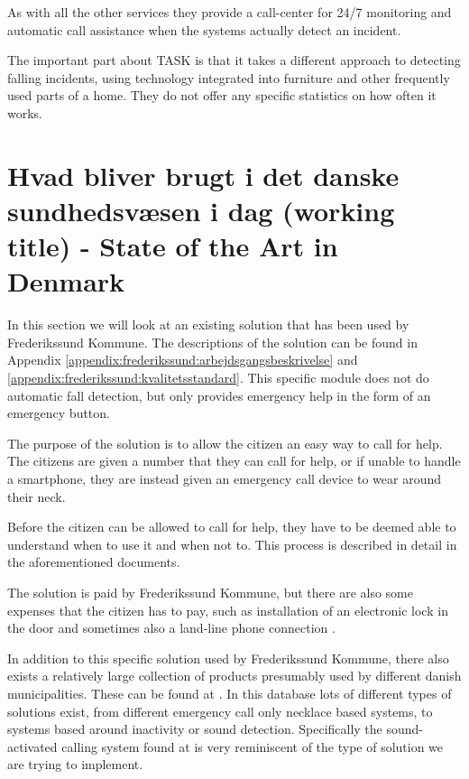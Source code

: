 As with all the other services they provide a call-center for 24/7 monitoring and automatic call assistance when the systems actually detect an incident.

The important part about TASK is that it takes a different approach to detecting falling incidents, using technology integrated into furniture and other frequently used parts of a home. They do not offer any specific statistics on how often it works. 

\section{Hvad bliver brugt i det danske sundhedsvæsen i dag (working title) - State of the Art in Denmark}
In this section we will look at an existing solution that has been used by Frederikssund Kommune. The descriptions of the solution can be found in Appendix \ref{appendix:frederikssund:arbejdsgangsbeskrivelse} and \ref{appendix:frederikssund:kvalitetsstandard}. This specific module does not do automatic fall detection, but only provides emergency help in the form of an emergency button.

The purpose of the solution is to allow the citizen an easy way to call for help. The citizens are given a number that they can call for help, or if unable to handle a smartphone, they are instead given an emergency call device to wear around their neck.

Before the citizen can be allowed to call for help, they have to be deemed able to understand when to use it and when not to. This process is described in detail in the aforementioned documents.

The solution is paid by Frederikssund Kommune, but there are also some expenses that the citizen has to pay, such as installation of an electronic lock in the door and sometimes also a land-line phone connection \cite{frederikssund:arbejdesbeskrivelse} \cite{frederikssund:kvalitetsstandard}.

In addition to this specific solution used by Frederikssund Kommune, there also exists a relatively large collection of products presumably used by different danish municipalities.
These can be found at \cite{hmi}. In this database lots of different types of solutions exist, from different emergency call only necklace based systems, to systems based around inactivity or sound detection. Specifically the sound-activated calling system found at \cite{hmilak} is very reminiscent of the type of solution we are trying to implement.

